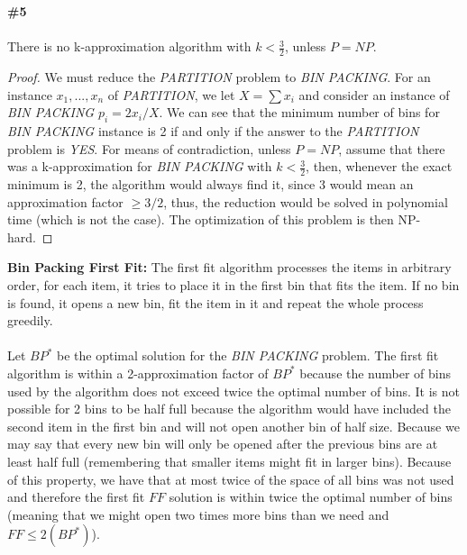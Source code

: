 \documentclass{article}
\begin{document}
\textbf{\#5}
\\
\\
There is no k-approximation algorithm with $k < \frac{3}{2}$, unless $P = NP$.
\begin{proof}
We must reduce the \textit{PARTITION} problem to \textit{BIN PACKING}. For an instance $x_1, ..., x_n$ of \textit{PARTITION}, we let $X = \sum x_i$ and consider an instance of \textit{BIN PACKING} $p_i = 2x_i/X$. We can see that the minimum number of bins for \textit{BIN PACKING} instance is 2 if and only if the answer to the \textit{PARTITION} problem is \textit{YES}. For means of contradiction, unless $P = NP$, assume that there was a k-approximation for \textit{BIN PACKING} with $k < \frac{3}{2}$, then, whenever the exact minimum is 2, the algorithm would always find it, since $3$ would mean an approximation factor $\geq 3/2$, thus, the reduction would be solved in polynomial time (which is not the case). The optimization of this problem is then NP-hard.
\end{proof}
\textbf{Bin Packing First Fit:} The first fit algorithm processes the items in arbitrary order, for each item, it tries to place it in the first bin that fits the item. If no bin is found, it opens a new bin, fit the item in it and repeat the whole process greedily.
\\
\\
Let $BP^*$ be the optimal solution for the \textit{BIN PACKING} problem. The first fit algorithm is within a 2-approximation factor of $BP^*$ because the number of bins used by the algorithm does not exceed twice the optimal number of bins. It is not possible for 2 bins to be half full because the algorithm would have included the second item in the first bin and will not open another bin of half size. Because we may say that every new bin will only be opened after the previous bins are at least half full (remembering that smaller items might fit in larger bins). Because of this property, we have that at most twice of the space of all bins was not used and therefore the first fit $FF$ solution is within twice the optimal number of bins (meaning that we might open two times more bins than we need and $FF \leq 2(BP^*)$).
\end{document}

